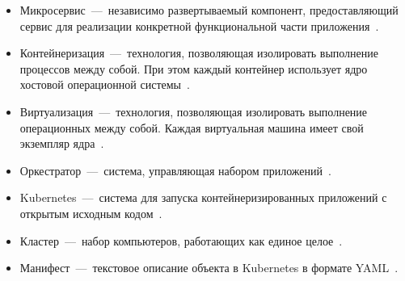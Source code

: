 \begin{definitions}
\begin{itemize}
	\item Микросервис~---~независимо развертываемый компонент, предоставляющий сервис для реализации конкретной функциональной части приложения~\cite{gostms}.
	\item Контейнеризация~---~технология, позволяющая изолировать выполнение процессов между собой. При этом каждый контейнер использует ядро хостовой операционной системы~\cite{luksa2017kubernetes}.
	\item Виртуализация~---~технология, позволяющая изолировать выполнение операционных между собой. Каждая виртуальная машина имеет свой экземпляр ядра~\cite{luksa2017kubernetes}.
	\item Оркестратор~---~система, управляющая набором приложений~\cite{сизов2024организация}.
	\item Kubernetes~---~система для запуска контейнеризированных приложений с открытым исходным кодом~\cite{kubernetes}.
	\item Кластер~---~набор компьютеров, работающих как единое целое~\cite{luksa2017kubernetes}.
	\item Манифест~---~текстовое описание объекта в Kubernetes в формате YAML~\cite{kubernetesresources}.
\end{itemize}
\end{definitions}